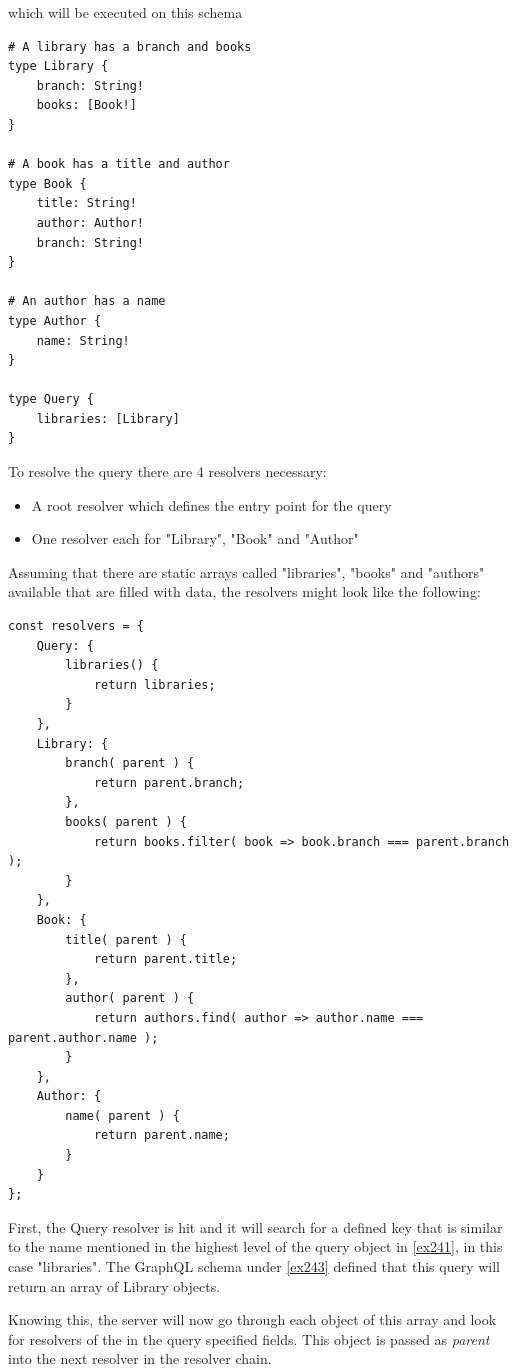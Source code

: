 \newpage
which will be executed on this schema \citep[with adaptions]{ApolloResChain}
\begin{lstlisting}[caption={Schema Definition},label={ex243}]
# A library has a branch and books 
type Library { 
	branch: String! 
	books: [Book!] 
} 

# A book has a title and author 
type Book { 
	title: String! 
	author: Author! 
	branch: String! 
} 

# An author has a name 
type Author { 
	name: String!
} 

type Query { 
	libraries: [Library] 
}
\end{lstlisting}

\noindent
To resolve the query there are 4 resolvers necessary:
\begin{itemize}
\item A root resolver which defines the entry point for the query
\item One resolver each for "Library", "Book" and "Author"
\end{itemize}

\noindent
Assuming that there are static arrays called "libraries", "books" and "authors" available that are filled with data, the resolvers might look like the following: 
\citep[with adaptions]{ApolloResChain}
\newpage
\lstset{language=JavaScript}
\begin{lstlisting}[caption={Resolver Definition},label={ex244}]
const resolvers = { 
	Query: { 
		libraries() { 
			return libraries; 
		} 
	}, 
	Library: { 
		branch( parent ) { 
			return parent.branch; 
		}, 
		books( parent ) { 
			return books.filter( book => book.branch === parent.branch ); 
		} 
	}, 
	Book: { 
		title( parent ) { 
			return parent.title; 
		}, 
		author( parent ) { 
			return authors.find( author => author.name === parent.author.name ); 
		} 
	}, 
	Author: { 
		name( parent ) { 
			return parent.name; 
		} 
	}
};
\end{lstlisting}

First, the Query resolver is hit and it will search for a defined key that is similar to the name mentioned in the highest level of the query object in \autoref{ex241}, in this case "libraries". The GraphQL schema under \autoref{ex243} defined that this query will return an array of Library objects.

Knowing this, the server will now go through each object of this array and look for resolvers of the in the query specified fields. This object is passed as \emph{parent} into the next resolver in the resolver chain.

